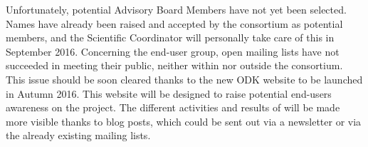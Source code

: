 \documentclass{deliverablereport}
\begin{document}
Unfortunately, potential Advisory Board Members have not yet been selected. Names have already been raised and
accepted by the consortium as potential members, and the Scientific Coordinator will personally take care of this in September 2016. Concerning the end-user group,
open mailing lists have not succeeded in meeting their public, neither within \ODK nor outside the consortium.
This issue should be soon cleared thanks to the new ODK website to be launched in Autumn 2016. This website will be designed to
raise potential end-users awareness on the project. The different activities and results of \ODK will be made more visible thanks to blog posts, which could be sent out
via a newsletter or via the already existing mailing lists.



\printbibliography
\end{document}
